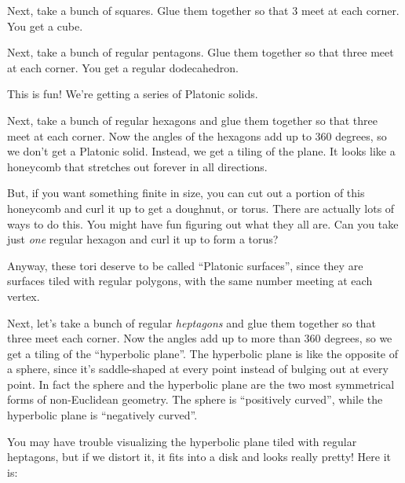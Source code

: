 \documentclass{article}
\def\tightlist{}
\renewcommand{\texttt}[1]{%
  \begingroup
  \ttfamily
  \begingroup\lccode`~=`/\lowercase{\endgroup\def~}{/\discretionary{}{}{}}%
  \begingroup\lccode`~=`[\lowercase{\endgroup\def~}{[\discretionary{}{}{}}%
  \begingroup\lccode`~=`.\lowercase{\endgroup\def~}{.\discretionary{}{}{}}%
  \catcode`/=\active\catcode`[=\active\catcode`.=\active
  \scantokens{#1\noexpand}%
  \endgroup
}
\begin{document}
Next, take a bunch of squares. Glue them together so that 3 meet at each
corner. You get a cube.

Next, take a bunch of regular pentagons. Glue them together so that
three meet at each corner. You get a regular dodecahedron.

This is fun! We're getting a series of Platonic solids.

Next, take a bunch of regular hexagons and glue them together so that
three meet at each corner. Now the angles of the hexagons add up to 360
degrees, so we don't get a Platonic solid. Instead, we get a tiling of
the plane. It looks like a honeycomb that stretches out forever in all
directions.

But, if you want something finite in size, you can cut out a portion of
this honeycomb and curl it up to get a doughnut, or torus. There are
actually lots of ways to do this. You might have fun figuring out what
they all are. Can you take just \emph{one} regular hexagon and curl it
up to form a torus?

Anyway, these tori deserve to be called ``Platonic surfaces'', since
they are surfaces tiled with regular polygons, with the same number
meeting at each vertex.

Next, let's take a bunch of regular \emph{heptagons} and glue them
together so that three meet each corner. Now the angles add up to more
than 360 degrees, so we get a tiling of the ``hyperbolic plane''. The
hyperbolic plane is like the opposite of a sphere, since it's
saddle-shaped at every point instead of bulging out at every point. In
fact the sphere and the hyperbolic plane are the two most symmetrical
forms of non-Euclidean geometry. The sphere is ``positively curved'',
while the hyperbolic plane is ``negatively curved''.

You may have trouble visualizing the hyperbolic plane tiled with regular
heptagons, but if we distort it, it fits into a disk and looks really
pretty! Here it is:

\end{document}
